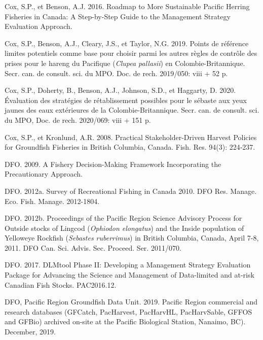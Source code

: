 \documentclass[french,11pt]{book}
\begin{document}
\leavevmode\hypertarget{ref-cox2016}{}%
Cox, S.P., et Benson, A.J. 2016. Roadmap to More Sustainable Pacific Herring Fisheries in Canada: A Step-by-Step Guide to the Management Strategy Evaluation Approach.

\leavevmode\hypertarget{ref-cox2019}{}%
Cox, S.P., Benson, A.J., Cleary, J.S., et Taylor, N.G. 2019. Points de référence limites potentiels comme base pour choisir parmi les autres règles de contrôle des prises pour le hareng du Pacifique (\emph{Clupea pallasii}) en Colombie-Britannique. Secr. can. de consult. sci. du MPO. Doc. de rech. 2019/050: viii + 52 p.

\leavevmode\hypertarget{ref-cox2020}{}%
Cox, S.P., Doherty, B., Benson, A.J., Johnson, S.D., et Haggarty, D. 2020. Évaluation des stratégies de rétablissement possibles pour le sébaste aux yeux jaunes des eaux extérieures de la Colombie-Britannique. Secr. can. de consult. sci. du MPO, Doc. de rech. 2020/069: viii + 151 p.

\leavevmode\hypertarget{ref-cox2008a}{}%
Cox, S.P., et Kronlund, A.R. 2008. Practical Stakeholder-Driven Harvest Policies for Groundfish Fisheries in British Columbia, Canada. Fish. Res. 94(3): 224‑237.

\leavevmode\hypertarget{ref-dfo2009}{}%
DFO. 2009. A Fishery Decision-Making Framework Incorporating the Precautionary Approach.

\leavevmode\hypertarget{ref-dfo2012}{}%
DFO. 2012a. Survey of Recreational Fishing in Canada 2010. DFO Res. Manage. Eco. Fish. Manage. 2012-1804.

\leavevmode\hypertarget{ref-dfo2012b}{}%
DFO. 2012b. Proceedings of the Pacific Region Science Advisory Process for Outside stocks of Lingcod (\emph{Ophiodon elongatus}) and the Inside population of Yelloweye Rockfish (\emph{Sebastes ruberrimus}) in British Columbia, Canada, April 7-8, 2011. DFO Can. Sci. Advis. Sec. Proceed. Ser. 2011/070.

\leavevmode\hypertarget{ref-dfo_dlmtool_2017}{}%
DFO. 2017. DLMtool Phase II: Developing a Management Strategy Evaluation Package for Advancing the Science and Management of Data-limited and at-risk Canadian Fish Stocks. PAC2016.12.

\leavevmode\hypertarget{ref-databases2019}{}%
DFO, Pacific Region Groundfish Data Unit. 2019. Pacific Region commercial and research databases (GFCatch, PacHarvest, PacHarvHL, PacHarvSable, GFFOS and GFBio) archived on-site at the Pacific Biological Station, Nanaimo, BC). December, 2019.
\end{document}
